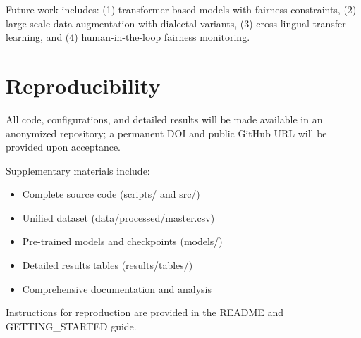 \documentclass[conference]{IEEEtran}
\begin{document}
Future work includes: (1) transformer-based models with fairness constraints, (2) large-scale data augmentation with dialectal variants, (3) cross-lingual transfer learning, and (4) human-in-the-loop fairness monitoring.

\section*{Reproducibility}

All code, configurations, and detailed results will be made available in an anonymized repository; a permanent DOI and public GitHub URL will be provided upon acceptance.

Supplementary materials include:
\begin{itemize}
\item Complete source code (scripts/ and src/)
\item Unified dataset (data/processed/master.csv)
\item Pre-trained models and checkpoints (models/)
\item Detailed results tables (results/tables/)
\item Comprehensive documentation and analysis
\end{itemize}

Instructions for reproduction are provided in the README and GETTING\_STARTED guide.
\end{document}
